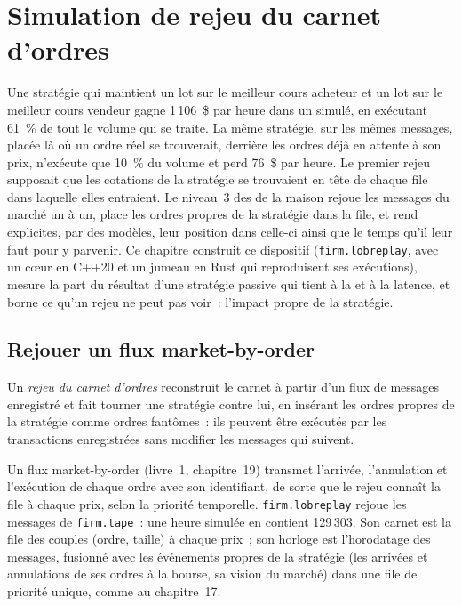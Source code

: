 \chapter{Simulation de rejeu du carnet d'ordres}\label{ch:rs:order-book-replay-simulation}

Une stratégie qui maintient un lot sur le meilleur cours acheteur et un lot sur le meilleur cours vendeur gagne 1\,106~\$ par heure dans un  simulé, en exécutant
61~\% de tout le volume qui se traite. La même stratégie, sur les mêmes messages, placée là où un ordre réel se trouverait, derrière les ordres déjà
en attente à son prix, n'exécute que 10~\% du volume et perd 76~\$ par heure. Le premier rejeu supposait que les cotations de la stratégie se trouvaient en tête de chaque
file dans laquelle elles entraient. Le niveau~3 des  de la maison rejoue les messages du marché un à un, place les ordres propres de la stratégie dans la file, et
rend explicites, par des modèles, leur position dans celle-ci ainsi que le temps qu'il leur faut pour y parvenir. Ce chapitre construit ce dispositif (\texttt{firm.lobreplay}, avec un cœur en C++20
et un jumeau en Rust qui reproduisent ses exécutions), mesure la part du résultat d'une stratégie passive qui tient à la  et à la latence, et borne ce qu'un
rejeu ne peut pas voir~: l'impact propre de la stratégie.

\section{Rejouer un flux market-by-order}

\begin{definition}\label{def:rs:order-book-replay-simulation:replay}
Un \emph{rejeu du carnet d'ordres} reconstruit le carnet à partir d'un flux de messages enregistré et fait tourner une stratégie contre lui, en insérant les
ordres propres de la stratégie comme ordres fantômes~: ils peuvent être exécutés par les transactions enregistrées sans modifier les messages qui suivent.
\end{definition}

Un flux market-by-order (livre~1, chapitre~19) transmet l'arrivée, l'annulation et l'exécution de chaque ordre avec son identifiant, de sorte que le rejeu connaît la
file à chaque prix, selon la priorité temporelle. \texttt{firm.lobreplay} rejoue les messages de \texttt{firm.tape}~: une heure simulée en contient 129\,303.
Son carnet est la file des couples (ordre, taille) à chaque prix~; son horloge est l'horodatage des messages, fusionné avec les événements propres de la stratégie (les arrivées et annulations de ses ordres
à la bourse, sa vision du marché) dans une file de priorité unique, comme au chapitre~17.

